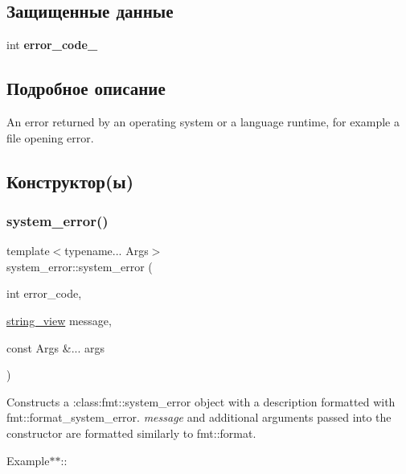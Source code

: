 \subsection*{Защищенные данные}
\begin{DoxyCompactItemize}
\item 
\mbox{\label{classsystem__error_a35ed90a7a994961cdb27b5a004b0e9de}} 
int {\bfseries error\+\_\+code\+\_\+}
\end{DoxyCompactItemize}


\subsection{Подробное описание}
An error returned by an operating system or a language runtime, for example a file opening error. 

\subsection{Конструктор(ы)}
\mbox{\label{classsystem__error_a6761fd4c8604a59a7c79f6bfdfaf25cb}} 
\subsubsection{\texorpdfstring{system\+\_\+error()}{system\_error()}}
{\footnotesize\ttfamily template$<$typename... Args$>$ \\
system\+\_\+error\+::system\+\_\+error (\begin{DoxyParamCaption}\item[{int}]{error\+\_\+code,  }\item[{\hyperlink{classbasic__string__view}{string\+\_\+view}}]{message,  }\item[{const Args \&...}]{args }\end{DoxyParamCaption})\hspace{0.3cm}{\ttfamily [inline]}}

Constructs a \+:class\+:{\ttfamily fmt\+::system\+\_\+error} object with a description formatted with {\ttfamily fmt\+::format\+\_\+system\+\_\+error}. {\itshape message} and additional arguments passed into the constructor are formatted similarly to {\ttfamily fmt\+::format}.

Example$\ast$$\ast$\+:\+:

